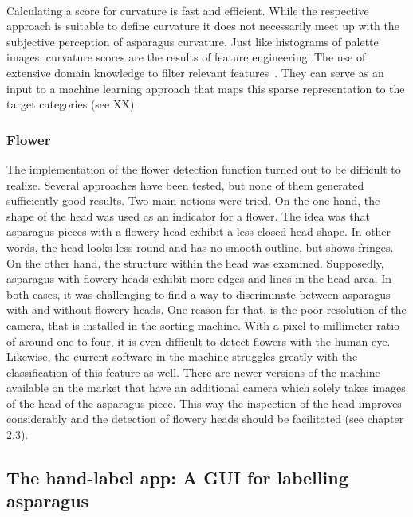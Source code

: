 \\
Calculating a score for curvature is fast and efficient. While the respective approach is suitable to define curvature it does not necessarily meet up with the subjective perception of asparagus curvature. Just like histograms of palette images, curvature scores are the results of feature engineering: The use of extensive domain knowledge to filter relevant features~\citep{zheng2018feature}. They can serve as an input to a machine learning approach that maps this sparse representation to the target categories  (see XX).


\subsubsection{Flower}

The implementation of the flower detection function turned out to be difficult to realize. Several approaches have been tested, but none of them generated sufficiently good results. Two main notions were tried. On the one hand, the shape of the head was used as an indicator for a flower. The idea was that asparagus pieces with a flowery head exhibit a less closed head shape. In other words, the head looks less round and has no smooth outline, but shows fringes. On the other hand, the structure within the head was examined. Supposedly, asparagus with flowery heads exhibit more edges and lines in the head area. In both cases, it was challenging to find a way to discriminate between asparagus with and without flowery heads. One reason for that, is the poor resolution of the camera, that is installed in the sorting machine. With a pixel to millimeter ratio of around one to four, it is even difficult to detect flowers with the human eye. Likewise, the current software in the machine struggles greatly with the classification of this feature as well. There are newer versions of the machine available on the market that have an additional camera which solely takes images of the head of the asparagus piece. This way the inspection of the head improves considerably and the detection of flowery heads should be facilitated (see chapter 2.3).


\subsection{The hand-label app: A GUI for labelling asparagus}

